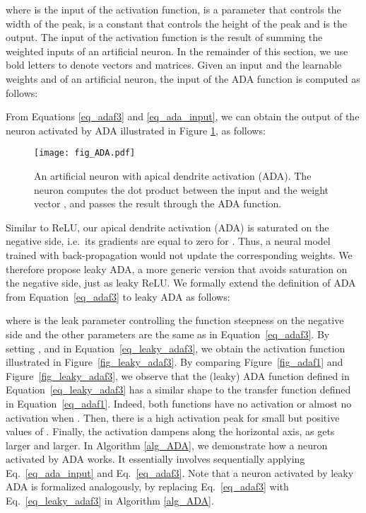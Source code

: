 \documentclass[pdflatex,sn-mathphys]{sn-jnl}
\theoremstyle{thmstyleone}
\theoremstyle{thmstyletwo}\newtheorem{example}{Example}\newtheorem{remark}{Remark}
\theoremstyle{thmstylethree}\newtheorem{definition}{Definition}\DeclareMathOperator{\sinc}{sinc}
\begin{document}
where  is the input of the activation function,  is a parameter that controls the width of the peak,  is a constant that controls the height of the peak and  is the output. The input  of the activation function is the result of summing the weighted inputs of an artificial neuron. In the remainder of this section, we use bold letters to denote vectors and matrices. Given an input  and the learnable weights  and  of an artificial neuron, the input of the ADA function is computed as follows:

From Equations \eqref{eq_adaf3} and \eqref{eq_ada_input}, we can obtain the output of the neuron activated by ADA illustrated in Figure {\ref{fig_ADA_neuron}}, as follows:


\begin{figure}[!t]
\begin{center}
\centerline{\texttt{[image: fig\_ADA.pdf]}}
\caption{An artificial neuron with apical dendrite activation (ADA). The neuron computes the dot product between the input  and the weight vector , and passes the result through the ADA function.}
\label{fig_ADA_neuron}
\end{center}
\end{figure}

Similar to ReLU, our apical dendrite activation (ADA) is saturated on the negative side, i.e.~its gradients are equal to zero for . Thus, a neural model trained with back-propagation \citep{Rumelhart-N-1986} would not update the corresponding weights. We therefore propose leaky ADA, a more generic version that avoids saturation on the negative side, just as leaky ReLU. We formally extend the definition of ADA from Equation~\eqref{eq_adaf3} to leaky ADA as follows:

where  is the leak parameter controlling the function steepness on the negative side and the other parameters are the same as in Equation~\eqref{eq_adaf3}. By setting ,  and  in Equation~\eqref{eq_leaky_adaf3}, we obtain the activation function illustrated in Figure~\ref{fig_leaky_adaf3}. By comparing Figure~\ref{fig_adaf1} and Figure~\ref{fig_leaky_adaf3}, we observe that the (leaky) ADA function defined in Equation~\eqref{eq_leaky_adaf3} has a similar shape to the transfer function defined in Equation~\eqref{eq_adaf1}. Indeed, both functions have no activation or almost no activation when . Then, there is a high activation peak for small but positive values of . Finally, the activation dampens along the horizontal axis, as  gets larger and larger. In Algorithm \ref{alg_ADA}, we demonstrate how a neuron activated by ADA works. It essentially involves sequentially applying Eq.~\eqref{eq_ada_input} and Eq.~\eqref{eq_adaf3}. Note that a neuron activated by leaky ADA is formalized analogously, by replacing Eq.~\eqref{eq_adaf3} with Eq.~\eqref{eq_leaky_adaf3} in Algorithm \ref{alg_ADA}.
\end{document}
